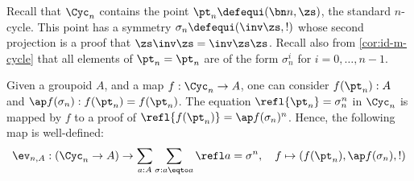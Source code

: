 Recall that $\Cyc_n$ contains the point $\pt_n \defequi (\bn n, \zs)$,
\ie the standard $n$-cycle. This
point has a symmetry $\sigma_n \defequi (\inv\zs, !)$ whose second projection is a
proof that $\zs\inv\zs = \inv\zs\zs$.
%
Recall also from \cref{cor:id-m-cycle} that all elements of $\pt_n = \pt_n$ are
of the form $\sigma_n^i$ for $i=0,\dots,n-1$.

Given a groupoid $A$, and a map $f :
\Cyc_n \to A$, one can consider $f(\pt_n):A$ and $\ap f (\sigma_n): f(\pt_n) =
f(\pt_n)$. The equation $\refl {\pt_n} = \sigma_n^n$ in
$\Cyc_n$ is mapped by $f$ to a proof of $\refl {f(\pt_n)} =
\ap f(\sigma_n)^n$. Hence, the following map is well-defined:
\begin{displaymath}
  \ev_{n,A} : (\Cyc_n \to A) \to \sum_{a:A}\sum_{\sigma:a\eqto a}\refl a = \sigma^n,\quad
  f \mapsto (f(\pt_n), \ap f (\sigma_n), !)
\end{displaymath}

